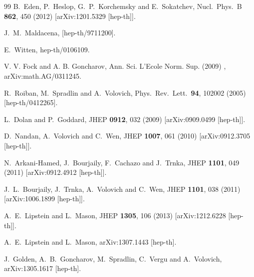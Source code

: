 \documentclass[12pt,nohyper,twosided]{JHEP3}
\begin{document}
\begin{thebibliography}{99}
  B.~Eden, P.~Heslop, G.~P.~Korchemsky and E.~Sokatchev,
  Nucl.\ Phys.\ B {\bf 862}, 450 (2012)
  [arXiv:1201.5329 [hep-th]].

  J.~M.~Maldacena,
  [hep-th/9711200].

  E.~Witten,
  hep-th/0106109.

V. V. Fock and A. B. Goncharov,
Ann. Sci. L'Ecole Norm. Sup. (2009) , arXiv:math.AG/0311245.

  R.~Roiban, M.~Spradlin and A.~Volovich,
  Phys.\ Rev.\ Lett.\  {\bf 94}, 102002 (2005)
  [hep-th/0412265].

  L.~Dolan and P.~Goddard,
  JHEP {\bf 0912}, 032 (2009)
  [arXiv:0909.0499 [hep-th]].

  D.~Nandan, A.~Volovich and C.~Wen,
  JHEP {\bf 1007}, 061 (2010)
  [arXiv:0912.3705 [hep-th]].

  N.~Arkani-Hamed, J.~Bourjaily, F.~Cachazo and J.~Trnka,
  JHEP {\bf 1101}, 049 (2011)
  [arXiv:0912.4912 [hep-th]].

  J.~L.~Bourjaily, J.~Trnka, A.~Volovich and C.~Wen,
  JHEP {\bf 1101}, 038 (2011)
  [arXiv:1006.1899 [hep-th]].

  A.~E.~Lipstein and L.~Mason,
  JHEP {\bf 1305}, 106 (2013)
  [arXiv:1212.6228 [hep-th]].

  A.~E.~Lipstein and L.~Mason,
  arXiv:1307.1443 [hep-th].

  J.~Golden, A.~B.~Goncharov, M.~Spradlin, C.~Vergu and A.~Volovich,
  arXiv:1305.1617 [hep-th].


\end{thebibliography}
\end{document}
